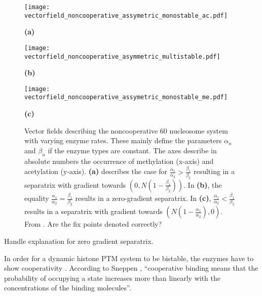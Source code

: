             \begin{figure}[ht!]
                \centering
                \begin{minipage}{0.3\textwidth}
                    \texttt{[image: vectorfield\_noncooperative\_assymetric\_monostable\_ac.pdf]}
                    \caption*{\small \textbf{(a)}}
                \end{minipage}
                \begin{minipage}{0.3\textwidth}
                    \texttt{[image: vectorfield\_noncooperative\_asymmetric\_multistable.pdf]}
                    \caption*{\small \textbf{(b)}}
                \end{minipage}
                \begin{minipage}{0.3\textwidth}
                    \texttt{[image: vectorfield\_noncooperative\_assymetric\_monostable\_me.pdf]}
                    \caption*{\small \textbf{(c)}}
                \end{minipage}
               \caption{\small  Vector fields describing the noncooperative 60 nucleosome system with varying enzyme rates. These mainly define the parameters $\alpha_n$ and $\beta_n$ if the enzyme types are constant. The axes describe in absolute numbers the occurrence of methylation (x-axis) and acetylation (y-axis). \textbf{(a)} describes the case for $\frac{\alpha_1}{\alpha_2} > \frac{\beta_1}{\beta_2}$ resulting in a separatrix with gradient towards $(0,N(1-\frac{\beta_1}{\beta_2}))$. In \textbf{(b)}, the equality $\frac{\alpha_1}{\alpha_2} = \frac{\beta_1}{\beta_2}$ results in a zero-gradient separatrix. In \textbf{(c)}, $\frac{\alpha_1}{\alpha_2} < \frac{\beta_1}{\beta_2}$ results in a separatrix with gradient towards $(N(1-\frac{\alpha_1}{\alpha_2}),0)$. From \cite{mayer2020langevin}. {\color{red} Are the fix points denoted correctly?}}
               \label{img:vectorFields}
            \end{figure}

            \begin{itemize}
                {
                    \color{red}
                    \item Handle explanation for zero gradient separatrix.
                }
            \end{itemize} %

            In order for a dynamic histone PTM system to be bistable, the enzymes have to show cooperativity \cite{dodd2011barriers,sneppen2019theoretical,mayer2020langevin}. According to Sneppen \cite[][p.48]{sneppen2014models}, \enquote{cooperative binding means that the probability of occupying a state increases more than linearly with the concentrations of the binding molecules}.

